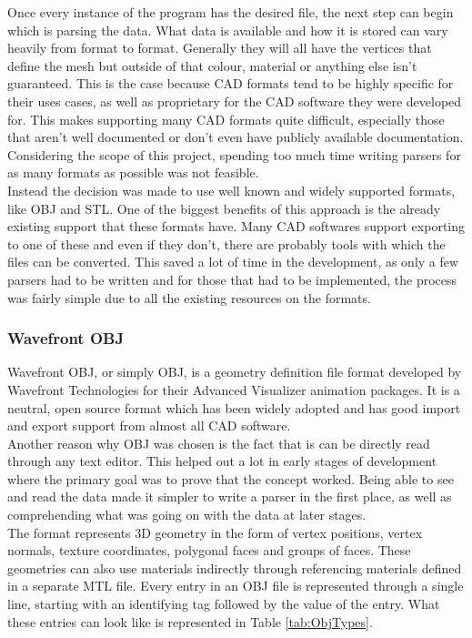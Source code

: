 Once every instance of the program has the desired file, the next step can begin which is parsing the data. What data is available and how it is stored can vary heavily from format to format. Generally they will all have the vertices that define the mesh but outside of that colour, material or anything else isn't guaranteed. This is the case because CAD formats tend to be highly specific for their uses cases, as well as proprietary for the CAD software they were developed for. This makes supporting many CAD formats quite difficult, especially those that aren't well documented or don't even have publicly available documentation. Considering the scope of this project, spending too much time writing parsers for as many formats as possible was not feasible.\\
Instead the decision was made to use well known and widely supported formats, like OBJ and STL. One of the biggest benefits of this approach is the already existing support that these formats have. Many CAD softwares support exporting to one of these and even if they don't, there are probably tools with which the files can be converted. This saved a lot of time in the development, as only a few parsers had to be written and for those that had to be implemented, the process was fairly simple due to all the existing resources on the formats.

\subsubsection{Wavefront OBJ}

Wavefront OBJ, or simply OBJ, is a geometry definition file format developed by Wavefront Technologies for their Advanced Visualizer animation packages. It is a neutral, open source format which has been widely adopted and has good import and export support from almost all CAD software.\\
Another reason why OBJ was chosen is the fact that is can be directly read through any text editor. This helped out a lot in early stages of development where the primary goal was to prove that the concept worked. Being able to see and read the data made it simpler to write a parser in the first place, as well as comprehending what was going on with the data at later stages.\\ 
The format represents 3D geometry in the form of vertex positions, vertex normals, texture coordinates, polygonal faces and groups of faces. These geometries can also use materials indirectly through referencing materials defined in a separate MTL file. Every entry in an OBJ file is represented through a single line, starting with an identifying tag followed by the value of the entry. What these entries can look like is represented in Table \ref{tab:ObjTypes}.

